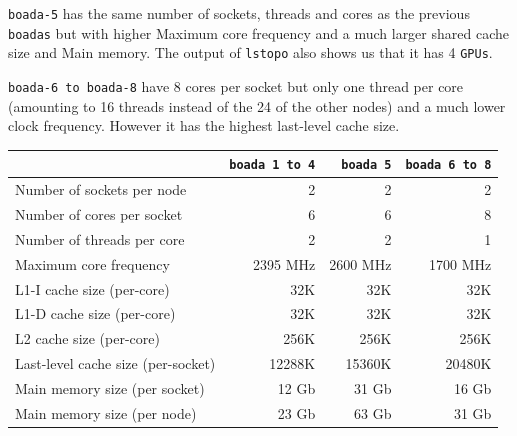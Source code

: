 \texttt{boada-5} has the same number of sockets, threads and cores as the previous \texttt{boadas} but with higher Maximum core frequency and a much larger shared cache size and Main memory.
The output of \texttt{lstopo} also shows us that it has 4 \texttt{GPUs}.

\texttt{boada-6 to boada-8} have 8 cores per socket but only one thread per core (amounting to 16 threads instead of the 24 of the other nodes) and a much lower clock frequency. However it has the
highest last-level cache size.

\begin{table}[H]%
    \label{tab:node_arch_and_mem}
    \centering
    \begin{tabular}{lrrr}

    \toprule
        & \texttt{boada 1 to 4} & \texttt{boada 5} & \texttt{boada 6 to 8} \\
    \midrule
        Number of sockets per node          & 2        & 2        & 2        \\
        Number of cores per socket          & 6        & 6        & 8        \\
        Number of threads per core          & 2        & 2        & 1        \\
        Maximum core frequency              & 2395 MHz & 2600 MHz & 1700 MHz \\
    \addlinespace[1em]
        L1-I cache size (per-core)          & 32K      & 32K      & 32K      \\
        L1-D cache size (per-core)          & 32K      & 32K      & 32K      \\
        L2 cache size (per-core)            & 256K     & 256K     & 256K     \\
        Last-level cache size (per-socket)  & 12288K   & 15360K   & 20480K   \\
    \addlinespace[1em]
        Main memory size (per socket)       & 12 Gb    & 31 Gb    & 16 Gb    \\
        Main memory size (per node)         & 23 Gb    & 63 Gb    & 31 Gb    \\
    \bottomrule

    \end{tabular}
\end{table}


